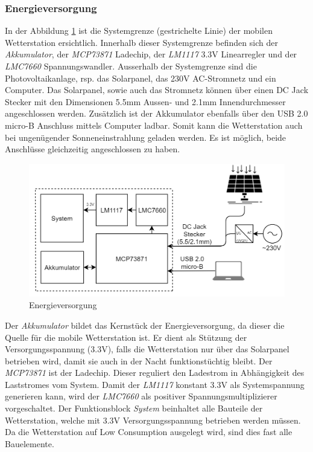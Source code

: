 \subsubsection{Energieversorgung}
\label{subsubsec:energieversorgung}

In der Abbildung \ref{fig:Energieversorgung} ist die Systemgrenze (gestrichelte Linie) der mobilen Wetterstation ersichtlich. Innerhalb dieser Systemgrenze befinden sich der \textit{Akkumulator}, der \textit{MCP73871} Ladechip, der \textit{LM1117} 3.3V Linearregler und der \textit{LMC7660} Spannungswandler. Ausserhalb der Systemgrenze sind die Photovoltaikanlage, rsp. das Solarpanel, das 230V AC-Stromnetz und ein Computer. Das Solarpanel, sowie auch das Stromnetz können über einen DC Jack Stecker mit den Dimensionen 5.5mm Aussen- und 2.1mm Innendurchmesser angeschlossen werden. Zusätzlich ist der Akkumulator ebenfalls über den USB 2.0 micro-B Anschluss mittels Computer ladbar. Somit kann die Wetterstation auch bei ungenügender Sonneneinstrahlung geladen werden. Es ist möglich, beide Anschlüsse gleichzeitig angeschlossen zu haben.\\

\begin{figure}[h]
	\centering
	\includegraphics[scale=0.5]{graphics/Konzeptdiagramme/Energieversorgung.PNG}
	\caption{Energieversorgung}
	\label{fig:Energieversorgung}
\end{figure}

Der \textit{Akkumulator} bildet das Kernstück der Energieversorgung, da dieser die Quelle für die mobile Wetterstation ist. Er dient als Stützung der Versorgungsspannung (3.3V), falls die Wetterstation nur über das Solarpanel betrieben wird, damit sie auch in der Nacht funktionstüchtig bleibt. Der \textit{MCP73871} ist der Ladechip. Dieser reguliert den Ladestrom in Abhängigkeit des Laststromes vom System. Damit der \textit{LM1117} konstant 3.3V als Systemspannung generieren kann, wird der \textit{LMC7660} als positiver Spannungsmultiplizierer vorgeschaltet. Der Funktionsblock \textit{System} beinhaltet alle Bauteile der Wetterstation, welche mit 3.3V Versorgungsspannung betrieben werden müssen. Da die Wetterstation auf Low Consumption ausgelegt wird, sind dies fast alle Bauelemente.\\
 